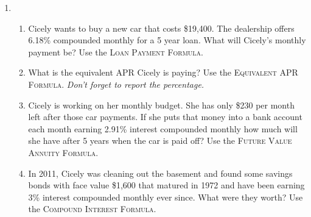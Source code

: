\begin{enumerate}
 \item \begin{enumerate} 
\item Cicely wants to buy a new car that costs \$19,400.  The dealership offers 6.18\% compounded monthly for a 5 year loan.  What will Cicely's monthly payment be? Use the \textsc{Loan Payment Formula}.  \vfill %
\item What is the equivalent APR Cicely  is paying?  Use the \textsc{Equivalent APR Formula}.   \emph{Don't forget to report the percentage.} \vfill %
\item Cicely is working on her monthly budget.  She has only \$230 per month left after those car payments.  If she puts that money into a bank account each month earning 2.91\% interest compounded monthly how much will she have after 5 years when the car is paid off?  Use the \textsc{Future Value Annuity Formula}.  \vfill  %
\item In 2011, Cicely was cleaning out the basement and found some savings bonds with face value \$1,600 that matured in 1972 and have been earning 3\% interest compounded monthly ever since.  What were they worth? Use the \textsc{Compound Interest Formula}. \vfill  %
\end{enumerate}


\end{enumerate}


